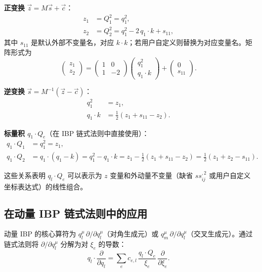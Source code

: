 ﻿\documentclass[a4paper,11pt]{article}
\begin{document}
\textbf{正变换} $\vec{z} = M \vec{s} + \vec{c}$：
\begin{align}
  z_1 &= Q_1^2 = q_1^2, \label{z1bubble} \\
  z_2 &= Q_2^2 = q_1^2 - 2\, q_1 \cdot k + s_{11}, \label{z2bubble}
\end{align}
其中 $s_{11}$ 是默认外部不变量名，对应 $k \cdot k$；若用户自定义则替换为对应变量名。矩阵形式为
\begin{equation}
  \begin{pmatrix} z_1 \\ z_2 \end{pmatrix}
  = \begin{pmatrix} 1 & 0 \\ 1 & -2 \end{pmatrix}
  \begin{pmatrix} q_1^2 \\ q_1 \cdot k \end{pmatrix}
  + \begin{pmatrix} 0 \\ s_{11} \end{pmatrix}.
  \label{bubbleMatrix}
\end{equation}

\textbf{逆变换} $\vec{s} = M^{-1}(\vec{z} - \vec{c})$：
\begin{align}
  q_1^2 &= z_1, \label{q1sqInv} \\
  q_1 \cdot k &= \frac{1}{2}(z_1 + s_{11} - z_2). \label{q1kInv}
\end{align}

\textbf{标量积 $q_1 \cdot Q_e$}（在 IBP 链式法则中直接使用）：
\begin{align}
  q_1 \cdot Q_1 &= q_1^2 = z_1, \label{q1Q1} \\
  q_1 \cdot Q_2 &= q_1 \cdot (q_1 - k) = q_1^2 - q_1 \cdot k = z_1 - \frac{1}{2}(z_1 + s_{11} - z_2) = \frac{1}{2}(z_1 + z_2 - s_{11}). \label{q1Q2}
\end{align}

这些关系表明 $q_l \cdot Q_e$ 可以表示为 $z$ 变量和外动量不变量（缺省 $ss_{ij}^{,2}$ 或用户自定义坐标表达式）的线性组合。

\subsection{在动量 IBP 链式法则中的应用}

动量 IBP 的核心算符为 $q_l^\mu\, \partial / \partial q_l^\mu$（对角生成元）或 $q_m^\mu\, \partial / \partial q_l^\mu$（交叉生成元）。通过链式法则将 $\partial / \partial q_l^\mu$ 分解为对 $\xi_e$ 的导数：
\begin{equation}
  q_l \cdot \frac{\partial}{\partial q_l} = \sum_e c_{e,l}\, \frac{q_l \cdot Q_e}{\xi_e}\, \frac{\partial}{\partial \xi_e}.
  \label{chainRuleXi}
\end{equation}
\end{document}
